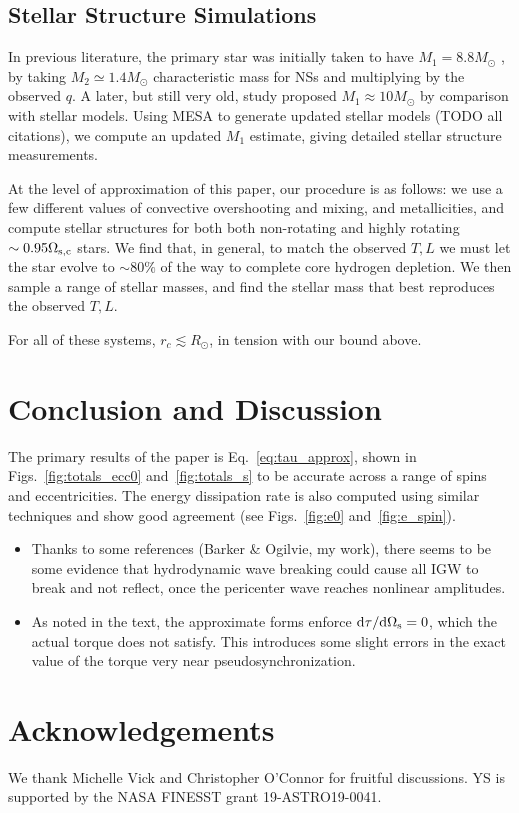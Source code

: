 \documentclass[
        fleqn,
        usenatbib,
    ]{mnras}
\newcommand*{\rdil}[2]{\mathrm{d}#1 / \mathrm{d}#2}
\begin{document}
\subsection{Stellar Structure Simulations}

In previous literature, the primary star was initially taken to have $M_1 =
8.8M_{\odot}$ \citep{kumar1998,lai1996}, by taking $M_2 \simeq 1.4M_{\odot}$
characteristic mass for NSs and multiplying by the observed $q$. A later, but
still very old, study proposed $M_1 \approx 10M_{\odot}$ by comparison with
stellar models. Using MESA to generate updated stellar models (TODO all
citations), we compute an updated $M_1$ estimate, giving detailed stellar
structure measurements.

At the level of approximation of this paper, our procedure is as follows: we
use a few different values of convective overshooting and mixing, and
metallicities, and compute stellar structures for both both non-rotating and
highly rotating $\sim 0.95\Omega_{\rm s, c}$ stars. We find that, in general, to
match the observed $T, L$ we must let the star evolve to $\sim 80\%$ of the way
to complete core hydrogen depletion. We then sample a range of stellar masses,
and find the stellar mass that best reproduces the observed $T, L$.

For all of these systems, $r_c \lesssim R_{\odot}$, in tension with our bound
above.

\section{Conclusion and Discussion}\label{s:disc}

The primary results of the paper is Eq.~\eqref{eq:tau_approx}, shown in
Figs.~\ref{fig:totals_ecc0} and~\ref{fig:totals_s} to be accurate across a range
of spins and eccentricities. The energy dissipation rate is also computed using
similar techniques and show good agreement (see Figs.~\ref{fig:e0}
and~\ref{fig:e_spin}).

\begin{itemize}
    \item Thanks to some references (Barker \& Ogilvie, my work), there seems to
        be some evidence that hydrodynamic wave breaking could cause all IGW to
        break and not reflect, once the pericenter wave reaches nonlinear
        amplitudes.

    \item As noted in the text, the approximate forms enforce
        $\rdil{\tau}{\Omega_{\rm s}} = 0$, which the actual torque does not satisfy.
        This introduces some slight errors in the exact value of the torque very
        near pseudosynchronization.
\end{itemize}

\section{Acknowledgements}

We thank Michelle Vick and Christopher O'Connor for fruitful discussions. YS is
supported by the NASA FINESST grant 19-ASTRO19-0041.%





\bsp
\label{lastpage} %
\end{document}

